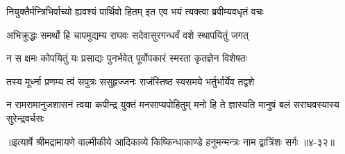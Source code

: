 \twolineshloka
{नियुक्तैर्मन्त्रिभिर्वाच्यो ह्यवश्यं पार्थिवो हितम्}
{इत एव भयं त्यक्त्वा ब्रवीम्यवधृतं वचः} %

\twolineshloka
{अभिक्रुद्धः समर्थो हि चापमुद्यम्य राघवः}
{सदेवासुरगन्धर्वं वशे स्थापयितुं जगत्} %

\twolineshloka
{न स क्षमः कोपयितुं यः प्रसाद्यः पुनर्भवेत्}
{पूर्वोपकारं स्मरता कृतज्ञेन विशेषतः} %

\twolineshloka
{तस्य मूर्ध्ना प्रणम्य त्वं सपुत्रः ससुहृज्जनः}
{राजंस्तिष्ठ स्वसमये भर्तुर्भार्येव तद्वशे} %

\twolineshloka
{न रामरामानुजशासनं त्वया कपीन्द्र युक्तं मनसाप्यपोहितुम्}
{मनो हि ते ज्ञास्यति मानुषं बलं सराघवस्यास्य सुरेन्द्रवर्चसः} %


॥इत्यार्षे श्रीमद्रामायणे वाल्मीकीये आदिकाव्ये किष्किन्धाकाण्डे हनुमन्मन्त्रः नाम द्वात्रिंशः सर्गः ॥४-३२॥
